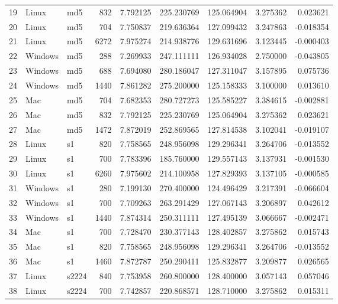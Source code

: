 \documentclass{IEEEtran}
\begin{document}
\begin{longtable}{rllrrrrrr}
  19 & Linux & md5 &     832 & 7.792125 & 225.230769 & 125.064904 & 3.275362 & 0.023621 \\ 
  20 & Linux & md5 &     704 & 7.750837 & 219.636364 & 127.099432 & 3.247863 & -0.018354 \\ 
  21 & Linux & md5 &    6272 & 7.975274 & 214.938776 & 129.631696 & 3.123445 & -0.000403 \\ 
  22 & Windows & md5 &     288 & 7.269933 & 247.111111 & 126.934028 & 2.750000 & -0.043805 \\ 
  23 & Windows & md5 &     688 & 7.694080 & 280.186047 & 127.311047 & 3.157895 & 0.075736 \\ 
  24 & Windows & md5 &    1440 & 7.861282 & 275.200000 & 125.158333 & 3.100000 & 0.013610 \\ 
  25 & Mac & md5 &     704 & 7.682353 & 280.727273 & 125.585227 & 3.384615 & -0.002881 \\ 
  26 & Mac & md5 &     832 & 7.792125 & 225.230769 & 125.064904 & 3.275362 & 0.023621 \\ 
  27 & Mac & md5 &    1472 & 7.872019 & 252.869565 & 127.814538 & 3.102041 & -0.019107 \\ 
  28 & Linux & s1 &     820 & 7.758565 & 248.956098 & 129.296341 & 3.264706 & -0.013552 \\ 
  29 & Linux & s1 &     700 & 7.783396 & 185.760000 & 129.557143 & 3.137931 & -0.001530 \\ 
  30 & Linux & s1 &    6260 & 7.975602 & 214.100958 & 127.829393 & 3.137105 & -0.000585 \\ 
  31 & Windows & s1 &     280 & 7.199130 & 270.400000 & 124.496429 & 3.217391 & -0.066604 \\ 
  32 & Windows & s1 &     700 & 7.709263 & 263.291429 & 127.067143 & 3.206897 & 0.042612 \\ 
  33 & Windows & s1 &    1440 & 7.874314 & 250.311111 & 127.495139 & 3.066667 & -0.002471 \\ 
  34 & Mac & s1 &     700 & 7.728470 & 230.377143 & 128.402857 & 3.275862 & 0.015743 \\ 
  35 & Mac & s1 &     820 & 7.758565 & 248.956098 & 129.296341 & 3.264706 & -0.013552 \\ 
  36 & Mac & s1 &    1460 & 7.872787 & 250.290411 & 125.832877 & 3.209877 & 0.026565 \\ 
  37 & Linux & s2224 &     840 & 7.753958 & 260.800000 & 128.400000 & 3.057143 & 0.057046 \\ 
  38 & Linux & s2224 &     700 & 7.742857 & 220.868571 & 128.710000 & 3.275862 & 0.015311 \\ 

\end{longtable}
\end{document}
